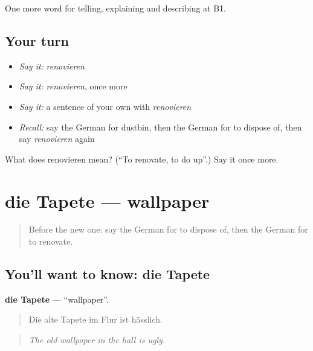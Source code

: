 \begin{grammarlens}[title={What you've built}]
One more word for telling, explaining and describing at B1.
\end{grammarlens}

\subsection*{Your turn}
\begin{itemize}
\raggedright
  \item \emph{Say it:} \emph{renovieren}
  \item \emph{Say it:} \emph{renovieren}, once more
  \item \emph{Say it:} a sentence of your own with \emph{renovieren}
  \item \emph{Recall:} say the German for dustbin, then the German for to dispose of, then say \emph{renovieren} again
\end{itemize}

\begin{tcolorbox}[breakable,colback=teal!4,colframe=teal!35!black,title={Before you move on}]
What does renovieren mean? (\textquotedblleft{}To renovate, to do up\textquotedblright{}.) Say it once more.
\end{tcolorbox}
\section[die Tapete]{die Tapete — wallpaper}

\label{lesson:GE-C529-tapete}



\begin{quote}
Before the new one: say the German for to dispose of, then the German for to renovate.
\end{quote}

\subsection*{You'll want to know: die Tapete}
\textbf{die Tapete} — \textquotedblleft{}wallpaper\textquotedblright{}.

\begin{quote}
Die alte Tapete im Flur ist hässlich.
\end{quote}

\begin{quote}
\emph{The old wallpaper in the hall is ugly.}
\end{quote}

